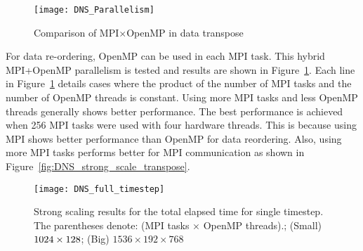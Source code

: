 \begin{figure}
 \begin{center}
   \texttt{[image: DNS\_Parallelism]}
   \caption{Comparison of MPI$\times$OpenMP in data transpose}
   \label{fig:DNS_MPI_OpenMP}
 \end{center}
\end{figure}


For data re-ordering, OpenMP can be used in each MPI task. This hybrid MPI+OpenMP parallelism
is tested and results are shown in Figure~\ref{fig:DNS_MPI_OpenMP}.
Each line in Figure~\ref{fig:DNS_MPI_OpenMP} details cases where the product of
the number of MPI tasks and the number of OpenMP threads is
constant. Using more MPI tasks and less OpenMP threads generally shows
better performance. The best performance is achieved when 256 MPI tasks
were used with four hardware threads. This is because using MPI shows
better performance than OpenMP for data reordering. Also, using more MPI
tasks performs better for MPI communication as shown in
Figure~\ref{fig:DNS_strong_scale_transpose}.


\begin{figure}
 \begin{center}
   \texttt{[image: DNS\_full\_timestep]}
   \caption{Strong scaling results for the total elapsed time for single timestep. The parentheses denote: (MPI tasks $\times$ OpenMP threads).; (Small) $1024 \times 128 \time 512$; (Big) $1536 \times 192 \times 768$}
   \label{fig:DNS_strong_scale_total_elapsed_time}
 \end{center}
\end{figure}

